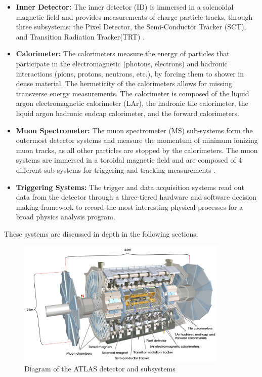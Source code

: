 \begin{itemize}

\item \textbf{Inner Detector:} The inner detector (ID)\cite{IDTDR1,IDTDR2} is immersed in a solenoidal magnetic field\cite{MagnetTDR} and provides measurements of charge particle tracks, through three subsystems: the Pixel Detector\cite{PixelTDR,PixelSensor}, the Semi-Conductor Tracker (SCT)\cite{SCTBarrel,SCTEndcap}, and Transition Radiation Tracker(TRT) \cite{TRTStraws, TRTBarrel,trtelec}. 

\item \textbf{Calorimeter:} The calorimeters measure the energy of particles that participate in the electromagnetic (photons, electrons) and hadronic interactions (pions, protons, neutrons, etc.), by forcing them to shower in dense material. The hermeticity of the calorimeters allows for missing transverse energy measurements. The calorimeter is composed of the liquid argon electromagnetic calorimeter (LAr)\cite{LArTDR:1996fq}, the hadronic tile calorimeter\cite{TileTDR}, the liquid argon hadronic endcap calorimeter, and the forward calorimeters.

\item \textbf{Muon Spectrometer:} The muon spectrometer (MS) sub-systems\cite{MuonTDR} form the outermost detector systems and measure the momentum of minimum ionizing muon tracks, as all other particles are stopped by the calorimeters. The muon systems are immersed in a toroidal magnetic field \cite{MagnetTDR} and are composed of 4 different sub-systems for triggering and tracking measurements \cite{RPCPaper,MDTPaper,CSCPaper}. 

\item \textbf{Triggering Systems:}  The trigger and data acquisition systems\cite{L1TDR,HLTTDR} read out data from the detector through a three-tiered hardware and software decision making framework to record the most interesting physical processes for a broad physics analysis program.   

\end{itemize}


These systems are discussed in depth in the following sections.
\begin{figure}[!t]
\centering 
\includegraphics[width=0.9\textwidth]{figs/lhc/ATLAS-eps-converted-to.pdf}
\caption{ Diagram of the ATLAS detector and subsystems 
}
\label{figure:lhc_atlas}
\end{figure}



